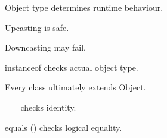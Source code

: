 \documentclass[11pt,a4paper]{book}
\begin{document}
\begin{rosettarule}

Object type determines
runtime behaviour.

\end{rosettarule}


\begin{rosettarule}

Upcasting is safe.

\end{rosettarule}


\begin{rosettarule}

Downcasting may fail.

\end{rosettarule}


\begin{rosettarule}

instanceof checks actual object type.

\end{rosettarule}


\begin{rosettarule}

Every class ultimately extends Object.

\end{rosettarule}


\begin{rosettarule}

==
checks identity.

\end{rosettarule}


\begin{rosettarule}

equals ()
checks logical equality.

\end{rosettarule}

\end{document}
